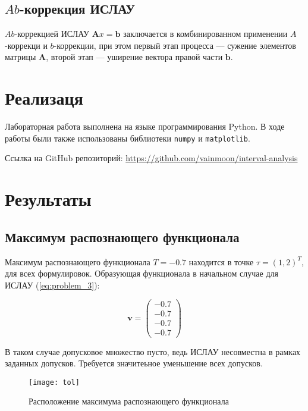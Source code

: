 \documentclass{article}
\begin{document}
\subsection{\( Ab \)-коррекция ИСЛАУ}

  \( Ab \)-коррекцией ИСЛАУ \( \mathbf{A}x = \mathbf{b} \) заключается
  в комбинированном применении \( A \)-коррекци и \( b \)-коррекции,
  при этом первый этап процесса --- сужение элементов матрицы
  \( \mathbf{A} \), второй этап --- уширение вектора правой части
  \( \mathbf{b} \).

  \section{Реализаця}

  Лабораторная работа выполнена на языке программирования Python. В ходе
  работы были также использованы библиотеки \verb!numpy! и
  \verb!matplotlib!.

  Ссылка на GitHub репозиторий:
  \url{https://github.com/vainmoon/interval-analysis}

  \section{Результаты}

  \subsection{Максимум распознающего функционала}

  Максимум распознающего функционала \( T = -0.7 \) находится в точке
  \( \tau = (1, 2)^T \), для всех формулировок. Образующая функционала в
  начальном случае для ИСЛАУ (\ref{eq:problem_3}):

  \begin{equation}
    \mathbf{v} = \begin{pmatrix}
      -0.7 \\
      -0.7 \\
      -0.7 \\
      -0.7
    \end{pmatrix}
  \end{equation}

  В таком случае допусковое множество пусто, ведь ИСЛАУ несовместна в рамках заданных допусков.
  Требуется значитеьное уменьшение всех допусков.
    \begin{figure}[htbp!]
        \begin{center}
            \texttt{[image: tol]}
            \caption{Расположение максимума распознающего функционала}
    \label{figure:tol}
        \end{center}
    \end{figure}
\end{document}
